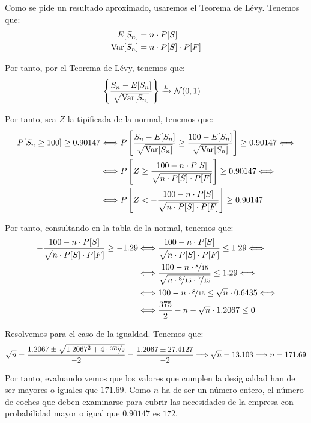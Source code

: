 \begin{ejercicio}
\begin{enumerate}
        Como se pide un resultado aproximado, usaremos el Teorema de Lévy. Tenemos que:
        \begin{align*}
            E[S_{n}] &= n \cdot P[S]\\
            \operatorname{Var}[S_{n}] &= n \cdot P[S] \cdot P[F]
        \end{align*}

        Por tanto, por el Teorema de Lévy, tenemos que:
        \begin{align*}
            \left\{\frac{S_{n}-E[S_n]}{\sqrt{\operatorname{Var}[S_{n}]}}\right\} &\xrightarrow{L} \mathcal{N}(0,1)
        \end{align*}

        Por tanto, sea $Z$ la tipificada de la normal, tenemos que:
        \begin{align*}
            P[S_{n} \geq 100] \geq 0.90147
            &\Longleftrightarrow P\left[\frac{S_{n}-E[S_n]}{\sqrt{\operatorname{Var}[S_{n}]}} \geq \frac{100 - E[S_n]}{\sqrt{\operatorname{Var}[S_{n}]}}\right] \geq 0.90147
            \Longleftrightarrow \\ & \Longleftrightarrow P\left[Z \geq \frac{100 - n \cdot P[S]}{\sqrt{n \cdot P[S] \cdot P[F]}}\right] \geq 0.90147
            \Longleftrightarrow \\ & \Longleftrightarrow P\left[Z < -\frac{100-n \cdot P[S]}{\sqrt{n \cdot P[S] \cdot P[F]}}\right] \geq 0.90147
        \end{align*}

        Por tanto, consultando en la tabla de la normal, tenemos que:
        \begin{align*}
            -\frac{100-n \cdot P[S]}{\sqrt{n \cdot P[S] \cdot P[F]}} \geq -1.29
            &\Longleftrightarrow \frac{100-n \cdot P[S]}{\sqrt{n \cdot P[S] \cdot P[F]}} \leq 1.29
            \Longleftrightarrow \\&\Longleftrightarrow \frac{100-n \cdot \nicefrac{8}{15}}{\sqrt{n \cdot \nicefrac{8}{15} \cdot \nicefrac{7}{15}}} \leq 1.29
            \Longleftrightarrow \\&\Longleftrightarrow 100-n \cdot \nicefrac{8}{15} \leq \sqrt{n}\cdot 0.6435
            \Longleftrightarrow \\&\Longleftrightarrow \frac{375}{2}-n-\sqrt{n}\cdot 1.2067 \leq 0
        \end{align*}

        Resolvemos para el caso de la igualdad. Tenemos que:
        \begin{equation*}
            \sqrt{n} = \frac{1.2067\pm \sqrt{1.2067^2+4\cdot \nicefrac{375}{2}}}{-2}
            = \frac{1.2067\pm 27.4127}{-2}
            \Longrightarrow
            \sqrt{n}=13.103 \Longrightarrow n=171.69
        \end{equation*}

        Por tanto, evaluando vemos que los valores que cumplen la desigualdad han de ser mayores o iguales que $171.69$. Como $n$ ha de ser un número entero, el número de coches que deben examinarse para cubrir las necesidades de la empresa con probabilidad mayor o igual que $0.90147$ es $172$.
    \end{enumerate}
\end{ejercicio}

